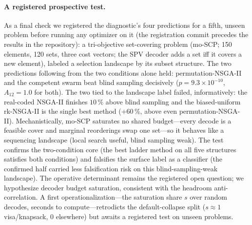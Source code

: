 \documentclass[runningheads]{llncs}
\begin{document}
\paragraph{A registered prospective test.}
As a final check we registered the diagnostic's four predictions for a fifth, unseen problem before running any optimizer on it (the registration commit precedes the results in the repository): a tri-objective set-covering problem (mo-SCP; 150 elements, 120 sets, three cost vectors; the SPV decoder adds a set iff it covers a new element), labeled a selection landscape by its subset structure. The two predictions following from the two conditions alone held: permutation-NSGA-II and the competent swarm beat blind sampling decisively ($p=9.3\times10^{-10}$, $A_{12}=1.0$ for both). The two tied to the landscape label failed, informatively: the real-coded NSGA-II finishes $10\,\%$ above blind sampling and the biased-uniform rk-NSGA-II is the single best method ($+60\,\%$, above even permutation-NSGA-II). Mechanistically, mo-SCP saturates no shared budget---every decode is a feasible cover and marginal reorderings swap one set---so it behaves like a sequencing landscape (local search useful, blind sampling weak). The test confirms the two-condition core (the best ladder method on all five structures satisfies both conditions) and falsifies the surface label as a classifier (the confirmed half carried less falsification risk on this blind-sampling-weak landscape). The operative determinant remains the registered open question; we hypothesize decoder budget saturation, consistent with the headroom anti-correlation. A first operationalization---the saturation share $s$ over random decodes, seconds to compute---retrodicts the default-collapse split ($s\approx1$ visa/knapsack, $0$ elsewhere) but awaits a registered test on unseen problems.
\end{document}
